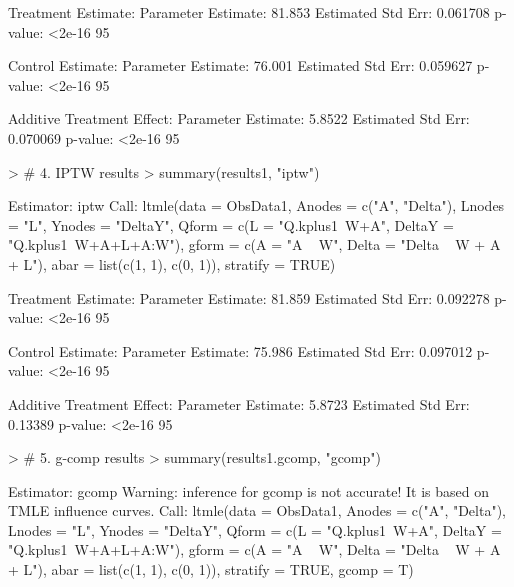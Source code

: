 \documentclass[answers]{exam}
\begin{document}
\begin{solution}
\begin{Schunk}
\begin{Soutput}
Treatment Estimate:
   Parameter Estimate:  81.853 
    Estimated Std Err:  0.061708 
              p-value:  <2e-16 
    95%

Control Estimate:
   Parameter Estimate:  76.001 
    Estimated Std Err:  0.059627 
              p-value:  <2e-16 
    95%

Additive Treatment Effect:
   Parameter Estimate:  5.8522 
    Estimated Std Err:  0.070069 
              p-value:  <2e-16 
    95%
\end{Soutput}
\end{Schunk}
\begin{Schunk}
\begin{Sinput}
> # 4. IPTW results
> summary(results1, "iptw")
\end{Sinput}
\begin{Soutput}
Estimator:  iptw 
Call:
ltmle(data = ObsData1, Anodes = c("A", "Delta"), Lnodes = "L", 
    Ynodes = "DeltaY", Qform = c(L = "Q.kplus1~W+A", DeltaY = "Q.kplus1~W+A+L+A:W"), 
    gform = c(A = "A ~ W", Delta = "Delta ~ W + A + L"), abar = list(c(1, 
        1), c(0, 1)), stratify = TRUE)

Treatment Estimate:
   Parameter Estimate:  81.859 
    Estimated Std Err:  0.092278 
              p-value:  <2e-16 
    95%

Control Estimate:
   Parameter Estimate:  75.986 
    Estimated Std Err:  0.097012 
              p-value:  <2e-16 
    95%

Additive Treatment Effect:
   Parameter Estimate:  5.8723 
    Estimated Std Err:  0.13389 
              p-value:  <2e-16 
    95%
\end{Soutput}
\end{Schunk}
\begin{Schunk}
\begin{Sinput}
> # 5. g-comp results
> summary(results1.gcomp, "gcomp")
\end{Sinput}
\begin{Soutput}
Estimator:  gcomp 
Warning: inference for gcomp is not accurate! It is based on TMLE influence curves.
Call:
ltmle(data = ObsData1, Anodes = c("A", "Delta"), Lnodes = "L", 
    Ynodes = "DeltaY", Qform = c(L = "Q.kplus1~W+A", DeltaY = "Q.kplus1~W+A+L+A:W"), 
    gform = c(A = "A ~ W", Delta = "Delta ~ W + A + L"), abar = list(c(1, 
        1), c(0, 1)), stratify = TRUE, gcomp = T)


\end{Soutput}
\end{Schunk}
\end{solution}
\end{document}
